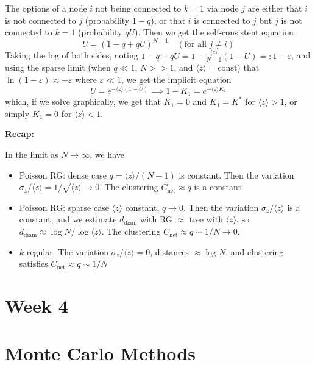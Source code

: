 \documentclass[12pt]{article}
\theoremstyle{definition}
\begin{document}
\begin{itemize}
    The options of a node $i$ not being connected to $k=1$ via node $j$ are either that $i$ is not connected to $j$ (probability $1-q$), or that $i$ is connected to $j$ but $j$ is not connected to $k=1$ (probability $qU$). Then we get the self-consistent equation 
    \[
    U=(1-q+qU)^{N-1} \quad (\text{for all }j\neq i)
    \]
    Taking the log of both sides, noting $1-q+qU=1-\frac{\langle z\rangle}{N-1}(1-U) =: 1-\varepsilon$, and using the sparse limit (when $q\ll 1$, $N>>1$, and $\langle z\rangle=\text{const}$) that $\ln(1-\varepsilon)\approx -\varepsilon$ where $\varepsilon\ll 1$, we get the implicit equation
    \[
    U=e^{-\langle z\rangle(1-U)}\implies 1-K_1=e^{-\langle z\rangle K_1}
    \]
    which, if we solve graphically, we get that $K_1=0$ and $K_1=K^*$ for $\langle z\rangle > 1$, or simply $K_1=0$ for $\langle z\rangle <1$. 
\end{itemize}

\textbf{Recap:}

In the limit as $N\to \infty$, we have

\begin{itemize}
    \item Poisson RG: dense case $q=\langle z\rangle/(N-1)$ is constant. Then the variation $\sigma_z/\langle z\rangle = 1/\sqrt{\langle z\rangle} \to 0$. The clustering $C_{\mathrm{net}} \approx q$ is a constant.

    \item Poisson RG: sparse case $\langle z\rangle$ constant, $q\to 0$. Then the variation $\sigma_z/\langle z\rangle$ is a constant, and we estimate $d_{\mathrm{diam}}$ with RG $\approx$ tree with $\langle  z\rangle$, so $d_{\mathrm{diam}} \approx \log N/\log \langle z\rangle$. The clustering $C_{\mathrm{net}} \approx q \sim 1/N\to 0$.

    \item $k$-regular. The variation $\sigma_z/\langle z\rangle = 0$, distances $\approx \log N $, and clustering satisfies $C_{\mathrm{net}} \approx q \sim 1/N$

\end{itemize}
\newpage


\section*{Week 4}

\section{Monte Carlo Methods}
\end{document}
